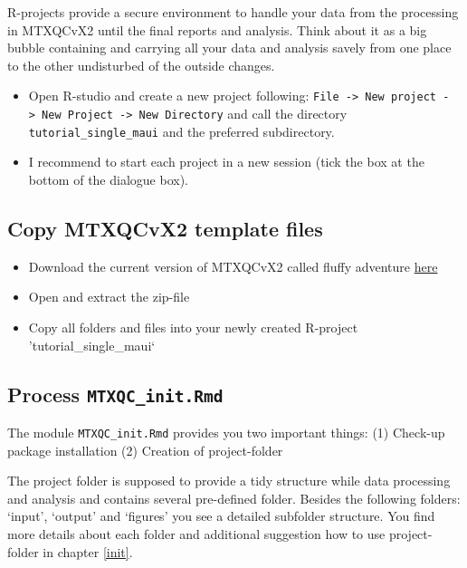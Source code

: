 \documentclass[]{book}
\providecommand{\tightlist}{%
  \setlength{\itemsep}{0pt}\setlength{\parskip}{0pt}}
\theoremstyle{definition}
\theoremstyle{definition}
\theoremstyle{definition}
\theoremstyle{remark}
\begin{document}
R-projects provide a secure environment to handle your data from the
processing in MTXQCvX2 until the final reports and analysis. Think about
it as a big bubble containing and carrying all your data and analysis
savely from one place to the other undisturbed of the outside changes.

\begin{itemize}
\tightlist
\item
  Open R-studio and create a new project following:
  \texttt{File\ -\textgreater{}\ New\ project\ -\textgreater{}\ New\ Project\ -\textgreater{}\ New\ Directory}
  and call the directory \texttt{tutorial\_single\_maui} and the
  preferred subdirectory.
\item
  I recommend to start each project in a new session (tick the box at
  the bottom of the dialogue box).
\end{itemize}

\subsection{Copy MTXQCvX2 template
files}\label{copy-mtxqcvx2-template-files}

\begin{itemize}
\tightlist
\item
  Download the current version of MTXQCvX2 called fluffy adventure
  \href{github.com/ChrisZasada/fluffy_adventure}{here}
\item
  Open and extract the zip-file
\item
  Copy all folders and files into your newly created R-project
  'tutorial\_single\_maui`
\end{itemize}

\subsection{\texorpdfstring{Process
\texttt{MTXQC\_init.Rmd}}{Process MTXQC\_init.Rmd}}\label{process-mtxqc_init.rmd}

The module \texttt{MTXQC\_init.Rmd} provides you two important things:
(1) Check-up package installation (2) Creation of project-folder

The project folder is supposed to provide a tidy structure while data
processing and analysis and contains several pre-defined folder. Besides
the following folders: `input', `output' and `figures' you see a
detailed subfolder structure. You find more details about each folder
and additional suggestion how to use project-folder in chapter
\ref{init}.
\end{document}
